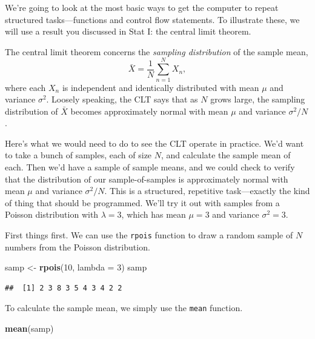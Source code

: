 \documentclass[
  12pt,
  oneside,openany]{book}
\newenvironment{Shaded}{\begin{snugshade}}{\end{snugshade}}
\newcommand{\DataTypeTok}[1]{\textcolor[rgb]{0.13,0.29,0.53}{#1}}
\newcommand{\DecValTok}[1]{\textcolor[rgb]{0.00,0.00,0.81}{#1}}
\newcommand{\KeywordTok}[1]{\textcolor[rgb]{0.13,0.29,0.53}{\textbf{#1}}}
\newcommand{\NormalTok}[1]{#1}
\newcommand{\StringTok}[1]{\textcolor[rgb]{0.31,0.60,0.02}{#1}}
\begin{document}
We're going to look at the most basic ways to get the computer to repeat structured tasks---functions and control flow statements. To illustrate these, we will use a result you discussed in Stat I: the central limit theorem.

The central limit theorem concerns the \emph{sampling distribution} of the sample mean,
\begin{equation*}
\bar{X} = \frac{1}{N} \sum_{n = 1}^{N} X_n,
\end{equation*}
where each \(X_n\) is independent and identically distributed with mean \(\mu\) and variance \(\sigma^2\). Loosely speaking, the CLT says that as \(N\) grows large, the sampling distribution of \(\bar{X}\) becomes approximately normal with mean \(\mu\) and variance \(\sigma^2 / N\).

Here's what we would need to do to see the CLT operate in practice. We'd want to take a bunch of samples, each of size \(N\), and calculate the sample mean of each. Then we'd have a sample of sample means, and we could check to verify that the distribution of our sample-of-samples is approximately normal with mean \(\mu\) and variance \(\sigma^2 / N\). This is a structured, repetitive task---exactly the kind of thing that should be programmed. We'll try it out with samples from a Poisson distribution with \(\lambda = 3\), which has mean \(\mu = 3\) and variance \(\sigma^2 = 3\).

First things first. We can use the \texttt{rpois} function to draw a random sample of \(N\) numbers from the Poisson distribution.

\begin{Shaded}
\begin{Highlighting}[]
\NormalTok{samp <{-}}\StringTok{ }\KeywordTok{rpois}\NormalTok{(}\DecValTok{10}\NormalTok{, }\DataTypeTok{lambda =} \DecValTok{3}\NormalTok{)}
\NormalTok{samp}
\end{Highlighting}
\end{Shaded}

\begin{verbatim}
##  [1] 2 3 8 3 5 4 3 4 2 2
\end{verbatim}

To calculate the sample mean, we simply use the \texttt{mean} function.

\begin{Shaded}
\begin{Highlighting}[]
\KeywordTok{mean}\NormalTok{(samp)}
\end{Highlighting}
\end{Shaded}
\end{document}
